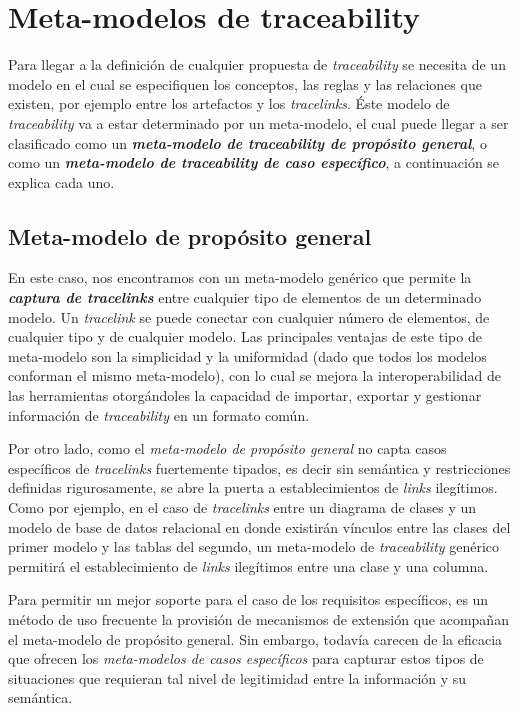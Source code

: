\documentclass[a4paper,12pt,oneside,spanish]{book}
\begin{document}
\section{Meta-modelos de traceability}

Para llegar a la definición de cualquier propuesta de \textit{traceability} se necesita de un modelo en el cual se especifiquen los conceptos, las reglas y las relaciones que existen, por ejemplo entre los artefactos y los \textit{tracelinks}. Éste modelo de \textit{traceability} va a estar determinado por un meta-modelo, el cual puede llegar a ser clasificado como un \textit{\textbf{meta-modelo de traceability de propósito general}}, o como un \textit{\textbf{meta-modelo de traceability de caso específico}}, a continuación se explica cada uno.

\subsection{Meta-modelo de propósito general}
\label{subsec:MetaModeloPropositoGeneral}

En este caso, nos encontramos con un meta-modelo genérico que permite la \textit{\textbf{captura de tracelinks}} entre cualquier tipo de elementos de un determinado modelo. Un \textit{tracelink} se puede conectar con cualquier número de elementos, de cualquier tipo y de cualquier modelo. Las principales ventajas de este tipo de meta-modelo son la simplicidad y la uniformidad (dado que todos los modelos conforman el mismo meta-modelo), con lo cual se mejora la interoperabilidad de las herramientas otorgándoles la capacidad de importar, exportar y gestionar información de \textit{traceability} en un formato común.

Por otro lado, como el \textit{meta-modelo de propósito general} no capta casos específicos de \textit{tracelinks} fuertemente tipados, es decir sin semántica y restricciones definidas rigurosamente, se abre la puerta a establecimientos de \textit{links} ilegítimos. Como por ejemplo, en el caso de \textit{tracelinks} entre un diagrama de clases y un modelo de base de datos relacional en donde existirán vínculos entre las clases del primer modelo y las tablas del segundo, un meta-modelo de \textit{traceability} genérico permitirá el establecimiento de \textit{links} ilegítimos entre una clase y una columna.

Para permitir un mejor soporte para el caso de los requisitos específicos, es un método de uso frecuente la provisión de mecanismos de extensión que acompañan el meta-modelo de propósito general. Sin embargo, todavía carecen de la eficacia que ofrecen los \textit{meta-modelos de casos específicos} para capturar estos tipos de situaciones que requieran tal nivel de legitimidad entre la información y su semántica.
\end{document}
